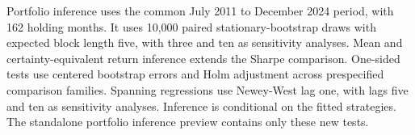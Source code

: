 Portfolio inference uses the common July 2011 to December 2024 period, with 162 holding months. It uses 10,000 paired stationary-bootstrap draws with expected block length five, with three and ten as sensitivity analyses. Mean and certainty-equivalent return inference extends the Sharpe comparison. One-sided tests use centered bootstrap errors and Holm adjustment across prespecified comparison families. Spanning regressions use Newey-West lag one, with lags five and ten as sensitivity analyses. Inference is conditional on the fitted strategies. The standalone portfolio inference preview contains only these new tests.
